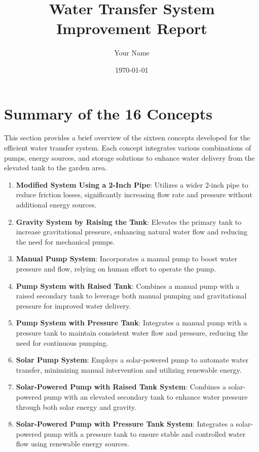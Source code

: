 \documentclass{article}
\title{Water Transfer System Improvement Report}
\author{Your Name}
\date{\today}
\begin{document}
\section{Summary of the 16 Concepts}

This section provides a brief overview of the sixteen concepts developed for the efficient water transfer system. Each concept integrates various combinations of pumps, energy sources, and storage solutions to enhance water delivery from the elevated tank to the garden area.

\begin{enumerate}[label=\textbf{\arabic*.}]
    \item \textbf{Modified System Using a 2-Inch Pipe}: Utilizes a wider 2-inch pipe to reduce friction losses, significantly increasing flow rate and pressure without additional energy sources.
    
    \item \textbf{Gravity System by Raising the Tank}: Elevates the primary tank to increase gravitational pressure, enhancing natural water flow and reducing the need for mechanical pumps.
    
    \item \textbf{Manual Pump System}: Incorporates a manual pump to boost water pressure and flow, relying on human effort to operate the pump.
    
    \item \textbf{Pump System with Raised Tank}: Combines a manual pump with a raised secondary tank to leverage both manual pumping and gravitational pressure for improved water delivery.
    
    \item \textbf{Pump System with Pressure Tank}: Integrates a manual pump with a pressure tank to maintain consistent water flow and pressure, reducing the need for continuous pumping.
    
    \item \textbf{Solar Pump System}: Employs a solar-powered pump to automate water transfer, minimizing manual intervention and utilizing renewable energy.
    
    \item \textbf{Solar-Powered Pump with Raised Tank System}: Combines a solar-powered pump with an elevated secondary tank to enhance water pressure through both solar energy and gravity.
    
    \item \textbf{Solar-Powered Pump with Pressure Tank System}: Integrates a solar-powered pump with a pressure tank to ensure stable and controlled water flow using renewable energy sources.
    

\end{enumerate}
\end{document}
